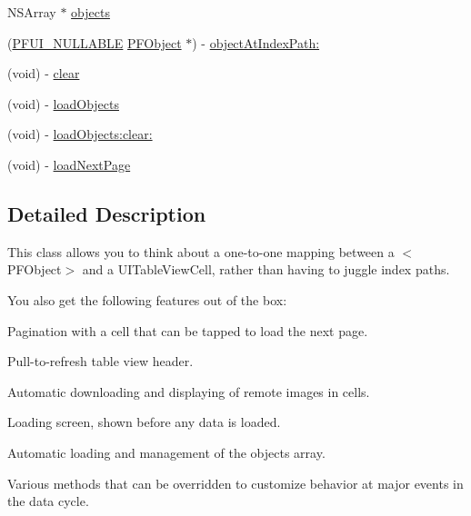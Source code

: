  \begin{DoxyCompactItemize}
\item 
N\+S\+Array $\ast$ \hyperlink{interface_p_f_query_table_view_controller_a7c13a3b0c79c7b98b534ebfa06d2c194}{objects}
\item 
(\hyperlink{_parse_u_i_constants_8h_af6e64a847348a9ac2a77923670373fe8}{P\+F\+U\+I\+\_\+\+N\+U\+L\+L\+A\+B\+L\+E} \hyperlink{interface_p_f_object}{P\+F\+Object} $\ast$) -\/ \hyperlink{interface_p_f_query_table_view_controller_ade469153b024a79167a66f6b0b654e40}{object\+At\+Index\+Path\+:}
\item 
(void) -\/ \hyperlink{interface_p_f_query_table_view_controller_ae733bbe29e12b2b3cdeaf106b614804e}{clear}
\item 
(void) -\/ \hyperlink{interface_p_f_query_table_view_controller_a4b016612f41127415c63b611ac51763a}{load\+Objects}
\item 
(void) -\/ \hyperlink{interface_p_f_query_table_view_controller_a5349a691adb92e260b43127df6e20e2c}{load\+Objects\+:clear\+:}
\item 
(void) -\/ \hyperlink{interface_p_f_query_table_view_controller_aa2948cd4e957006f69c1f98b2452120e}{load\+Next\+Page}
\end{DoxyCompactItemize}


\subsection{Detailed Description}
This class allows you to think about a one-\/to-\/one mapping between a $<$\+P\+F\+Object$>$ and a {\ttfamily U\+I\+Table\+View\+Cell}, rather than having to juggle index paths.

You also get the following features out of the box\+:


\begin{DoxyItemize}
\item Pagination with a cell that can be tapped to load the next page.
\item Pull-\/to-\/refresh table view header.
\item Automatic downloading and displaying of remote images in cells.
\item Loading screen, shown before any data is loaded.
\item Automatic loading and management of the objects array.
\item Various methods that can be overridden to customize behavior at major events in the data cycle. 
\end{DoxyItemize}

